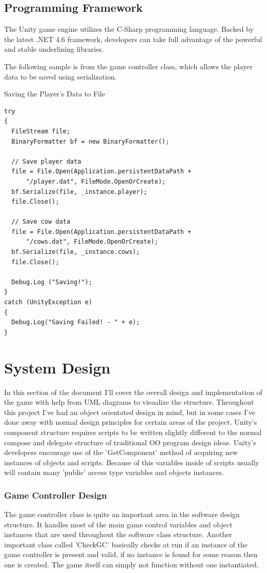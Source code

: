 \section{Programming Framework}
The Unity game engine utilizes the C-Sharp programming language. Backed by the latest .NET 4.6 framework, developers can take full advantage of the powerful and stable underlining libraries. 

The following sample is from the game controller class, which allows the player data to be saved using serialization.

Saving the Player's Data to File
\begin{verbatim}
try
{
  FileStream file;
  BinaryFormatter bf = new BinaryFormatter();

  // Save player data
  file = File.Open(Application.persistentDataPath + 
	  "/player.dat", FileMode.OpenOrCreate);
  bf.Serialize(file, _instance.player);
  file.Close();

  // Save cow data
  file = File.Open(Application.persistentDataPath + 
	  "/cows.dat", FileMode.OpenOrCreate);
  bf.Serialize(file, _instance.cows);
  file.Close();

  Debug.Log ("Saving!");
}
catch (UnityException e)
{
  Debug.Log("Saving Failed! - " + e);
}
\end{verbatim}
\chapter{System Design}
In this section of the document I'll cover the overall design and implementation of the game with help from UML diagrams to visualize the structure. Throughout this project I've had an object orientated design in mind, but in some cases I've done away with normal design principles for certain areas of the project. Unity's component structure requires scripts to be written slightly different to the normal compose and delegate structure of traditional OO program design ideas. Unity's developers encourage use of the 'GetComponent' method of acquiring new instances of objects and scripts. Because of this variables inside of scripts usually will contain many 'public' access type variables and objects instances.
\subsection{Game Controller Design}
The game controller class is quite an important area in the software design structure. It handles most of the main game control variables and object instances that are used throughout the software class structure. Another important class called 'CheckGC' basically checks at run if an instance of the game controller is present and valid, if no instance is found for some reason then one is created. The game itself can simply not function without one instantiated.

